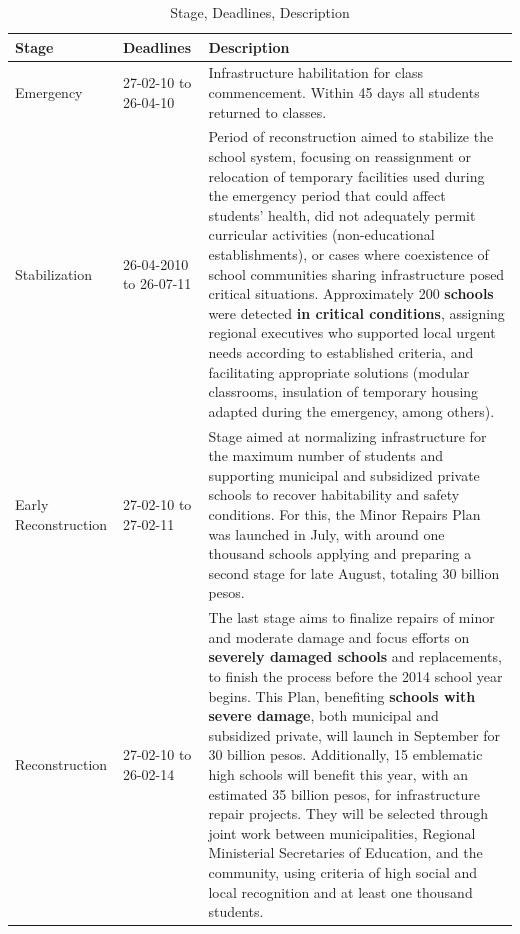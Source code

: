 \begin{table}[h!]
\centering
\caption{Stage, Deadlines, Description}\label{tab:plan}
\begin{tabular}{|l|l|p{8cm}|}
\hline
\textbf{Stage} & \textbf{Deadlines} & \textbf{Description} \\
\hline
Emergency & 27-02-10 to 26-04-10 & Infrastructure habilitation for class commencement. Within 45 days all students returned to classes. \\
\hline
Stabilization & 26-04-2010 to 26-07-11 & Period of reconstruction aimed to stabilize the school system, focusing on reassignment or relocation of temporary facilities used during the emergency period that could affect students' health, did not adequately permit curricular activities (non-educational establishments), or cases where coexistence of school communities sharing infrastructure posed critical situations. Approximately 200 {\bf schools} were detected {\bf in critical conditions}, assigning regional executives who supported local urgent needs according to established criteria, and facilitating appropriate solutions (modular classrooms, insulation of temporary housing adapted during the emergency, among others). \\
\hline
Early Reconstruction & 27-02-10 to 27-02-11 & Stage aimed at normalizing infrastructure for the maximum number of students and supporting municipal and subsidized private schools to recover habitability and safety conditions. For this, the Minor Repairs Plan was launched in July, with around one thousand schools applying and preparing a second stage for late August, totaling 30 billion pesos. \\
\hline
Reconstruction & 27-02-10 to 26-02-14 & The last stage aims to finalize repairs of minor and moderate damage and focus efforts on {\bf severely damaged schools} and replacements, to finish the process before the 2014 school year begins. This Plan, benefiting {\bf schools with severe damage}, both municipal and subsidized private, will launch in September for 30 billion pesos. Additionally, 15 emblematic high schools will benefit this year, with an estimated 35 billion pesos, for infrastructure repair projects. They will be selected through joint work between municipalities, Regional Ministerial Secretaries of Education, and the community, using criteria of high social and local recognition and at least one thousand students. \\
\hline
\end{tabular}
\end{table}
